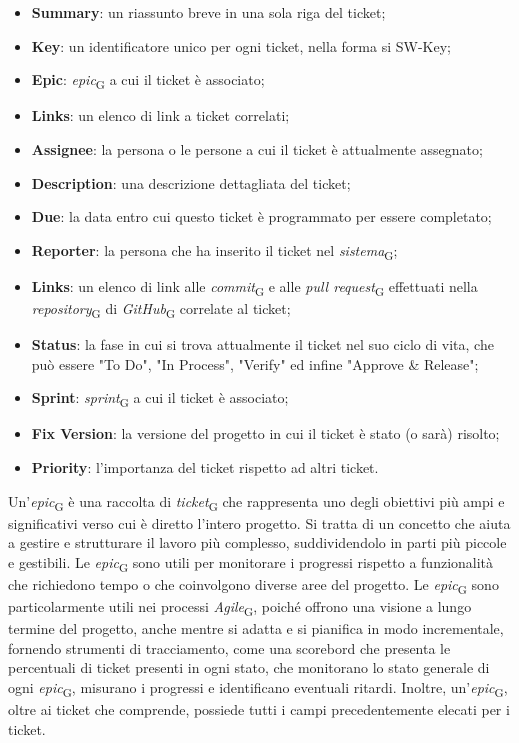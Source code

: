 \begin{itemize}
    \item \textbf{Summary}: un riassunto breve in una sola riga del ticket;
    \item \textbf{Key}: un identificatore unico per ogni ticket, nella forma si SW-Key;
    \item \textbf{Epic}: \textit{epic}\textsubscript{G} a cui il ticket è associato;
    \item \textbf{Links}: un elenco di link a ticket correlati;
    \item \textbf{Assignee}: la persona o le persone a cui il ticket è attualmente assegnato;
    \item \textbf{Description}: una descrizione dettagliata del ticket;
    \item \textbf{Due}: la data entro cui questo ticket è programmato per essere completato;
    \item \textbf{Reporter}: la persona che ha inserito il ticket nel \textit{sistema}\textsubscript{G};
    \item \textbf{Links}: un elenco di link alle \textit{commit}\textsubscript{G} e alle \textit{pull request}\textsubscript{G} effettuati nella \textit{repository}\textsubscript{G} di \textit{GitHub}\textsubscript{G} correlate al ticket;
    \item \textbf{Status}: la fase in cui si trova attualmente il ticket nel suo ciclo di vita, che può essere "To Do", "In Process", "Verify" ed infine "Approve \& Release";
    \item \textbf{Sprint}: \textit{sprint}\textsubscript{G} a cui il ticket è associato;
    \item \textbf{Fix Version}: la versione del progetto in cui il ticket è stato (o sarà) risolto;
    \item \textbf{Priority}: l'importanza del ticket rispetto ad altri ticket.
\end{itemize}
Un'\textit{epic}\textsubscript{G} è una raccolta di \textit{ticket}\textsubscript{G} che rappresenta uno degli obiettivi più ampi e significativi verso cui è diretto l'intero progetto. Si tratta di un concetto che aiuta a gestire e strutturare il lavoro più complesso, suddividendolo in parti più piccole e gestibili. Le \textit{epic}\textsubscript{G} sono utili per monitorare i progressi rispetto a funzionalità che richiedono tempo o che coinvolgono diverse aree del progetto. Le \textit{epic}\textsubscript{G} sono particolarmente utili nei processi \textit{Agile}\textsubscript{G}, poiché offrono una visione a lungo termine del progetto, anche mentre si adatta e si pianifica in modo incrementale, fornendo strumenti di tracciamento, come una scorebord che presenta le percentuali di ticket presenti in ogni stato, che monitorano lo stato generale di ogni \textit{epic}\textsubscript{G}, misurano i progressi e identificano eventuali ritardi. Inoltre, un'\textit{epic}\textsubscript{G}, oltre ai ticket che comprende, possiede tutti i campi precedentemente elecati per i ticket.
